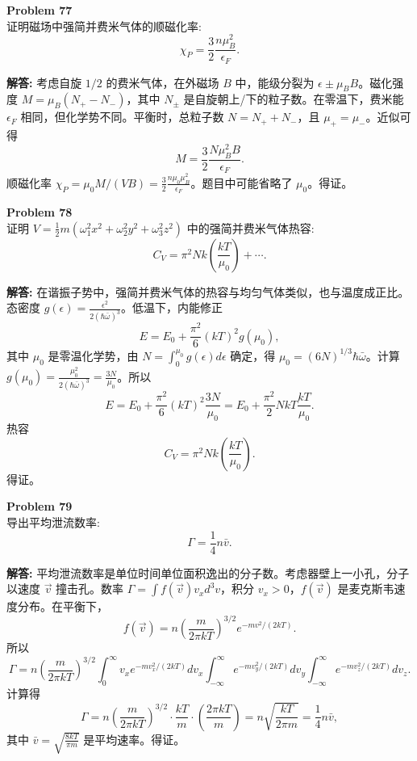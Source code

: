 \documentclass[12pt, a4paper, oneside]{ctexart}
\newenvironment{solution}{\par\noindent\textbf{解答:}\quad}{\par}
\begin{document}
\begin{mdframed}[backgroundcolor=gray!10, linewidth=0pt]
    \textbf{Problem 77} \\
    证明磁场中强简并费米气体的顺磁化率:
    \[
    \chi_P = \frac{3}{2} \frac{n \mu_B^2}{\epsilon_F}.
    \]
\end{mdframed}
\begin{solution}
    考虑自旋 $1/2$ 的费米气体，在外磁场 $B$ 中，能级分裂为 $\epsilon \pm \mu_B B$。磁化强度 $M = \mu_B (N_+ - N_-)$，其中 $N_\pm$ 是自旋朝上/下的粒子数。在零温下，费米能 $\epsilon_F$ 相同，但化学势不同。平衡时，总粒子数 $N = N_+ + N_-$，且 $\mu_+ = \mu_-$。近似可得
    \[
    M = \frac{3}{2} \frac{N \mu_B^2 B}{\epsilon_F}.
    \]
    顺磁化率 $\chi_P = \mu_0 M / (VB) = \frac{3}{2} \frac{n \mu_0 \mu_B^2}{\epsilon_F}$。题目中可能省略了 $\mu_0$。得证。
\end{solution}

\begin{mdframed}[backgroundcolor=gray!10, linewidth=0pt]
    \textbf{Problem 78} \\
    证明 $V = \frac{1}{2} m (\omega_1^2 x^2 + \omega_2^2 y^2 + \omega_3^2 z^2)$ 中的强简并费米气体热容:
    \[
    C_V = \pi^2 N k \left( \frac{kT}{\mu_0} \right) + \cdots.
    \]
\end{mdframed}
\begin{solution}
    在谐振子势中，强简并费米气体的热容与均匀气体类似，也与温度成正比。态密度 $g(\epsilon) = \frac{\epsilon^2}{2 (\hbar \bar{\omega})^3}$。低温下，内能修正
    \[
    E = E_0 + \frac{\pi^2}{6} (kT)^2 g(\mu_0),
    \]
    其中 $\mu_0$ 是零温化学势，由 $N = \int_0^{\mu_0} g(\epsilon) d\epsilon$ 确定，得 $\mu_0 = (6N)^{1/3} \hbar \bar{\omega}$。计算 $g(\mu_0) = \frac{\mu_0^2}{2 (\hbar \bar{\omega})^3} = \frac{3N}{\mu_0}$。所以
    \[
    E = E_0 + \frac{\pi^2}{6} (kT)^2 \frac{3N}{\mu_0} = E_0 + \frac{\pi^2}{2} N k T \frac{kT}{\mu_0}.
    \]
    热容
    \[
    C_V = \pi^2 N k \left( \frac{kT}{\mu_0} \right).
    \]
    得证。
\end{solution}

\begin{mdframed}[backgroundcolor=gray!10, linewidth=0pt]
    \textbf{Problem 79} \\
    导出平均泄流数率:
    \[
    \Gamma = \frac{1}{4} n \bar{v}.
    \]
\end{mdframed}
\begin{solution}
    平均泄流数率是单位时间单位面积逸出的分子数。考虑器壁上一小孔，分子以速度 $\vec{v}$ 撞击孔。数率 $\Gamma = \int f(\vec{v}) v_x d^3v$，积分 $v_x > 0$，$f(\vec{v})$ 是麦克斯韦速度分布。在平衡下，
    \[
    f(\vec{v}) = n \left( \frac{m}{2\pi kT} \right)^{3/2} e^{-m v^2/(2kT)}.
    \]
    所以
    \[
    \Gamma = n \left( \frac{m}{2\pi kT} \right)^{3/2} \int_0^\infty v_x e^{-m v_x^2/(2kT)} dv_x \int_{-\infty}^\infty e^{-m v_y^2/(2kT)} dv_y \int_{-\infty}^\infty e^{-m v_z^2/(2kT)} dv_z.
    \]
    计算得
    \[
    \Gamma = n \left( \frac{m}{2\pi kT} \right)^{3/2} \cdot \frac{kT}{m} \cdot \left( \frac{2\pi kT}{m} \right) = n \sqrt{\frac{kT}{2\pi m}} = \frac{1}{4} n \bar{v},
    \]
    其中 $\bar{v} = \sqrt{\frac{8kT}{\pi m}}$ 是平均速率。得证。
\end{solution}
\end{document}
